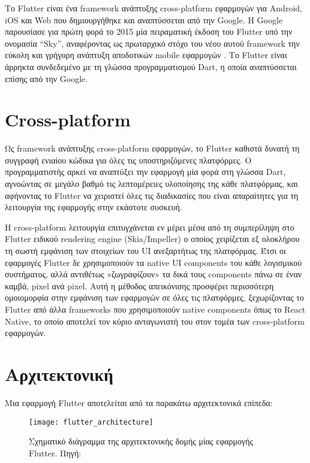 \documentclass[../thesis.tex]{subfiles}
\begin{document}
Το Flutter είναι ένα framework ανάπτυξης cross-platform εφαρμογών για Android, iOS και Web που δημιουργήθηκε και αναπτύσσεται από την Google.
Η Google παρουσίασε για πρώτη φορά το 2015 μία πειραματική έκδοση του Flutter υπό την ονομασία “Sky”, αναφέροντας ως πρωταρχικό στόχο του νέου αυτού framework την εύκολη και γρήγορη ανάπτυξη αποδοτικών mobile εφαρμογών \cite{flutter_presentation}.
Το Flutter είναι άρρηκτα συνδεδεμένο με τη γλώσσα προγραμματισμού Dart, η οποία αναπτύσσεται επίσης από την Google.

\section{Cross-platform}
Ως framework ανάπτυξης cross-platform εφαρμογών, το Flutter καθιστά δυνατή τη συγγραφή ενιαίου κώδικα για όλες τις υποστηριζόμενες πλατφόρμες.
Ο προγραμματιστής αρκεί να αναπτύξει την εφαρμογή μία φορά στη γλώσσα Dart,
αγνοώντας σε μεγάλο βαθμό τις λεπτομέρειες υλοποίησης της κάθε πλατφόρμας,
και αφήνοντας το Flutter να χειριστεί όλες τις διαδικασίες που είναι απαραίτητες για τη λειτουργία της εφαρμογής στην εκάστοτε συσκευή.

Η cross-platform λειτουργία επιτυγχάνεται εν μέρει μέσα από τη συμπερίληψη στο Flutter ειδικού rendering engine (Skia/Impeller) ο οποίος χειρίζεται εξ ολοκλήρου τη σωστή εμφάνιση των στοιχείων του UI ανεξαρτήτως της πλατφόρμας.
Έτσι οι εφαρμογές Flutter δε χρησιμοποιούν τα native UI components του κάθε λογισμικού συστήματος, αλλά αντιθέτως «ζωγραφίζουν» τα δικά τους components πάνω σε έναν καμβά, pixel ανά pixel.
Αυτή η μέθοδος απεικόνισης προσφέρει περισσότερη ομοιομορφία στην εμφάνιση των εφαρμογών σε όλες τις πλατφόρμες, ξεχωρίζοντας το Flutter από άλλα frameworks που χρησιμοποιούν native components όπως το React Native, το οποίο αποτελεί τον κύριο ανταγωνιστή του στον τομέα των cross-platform εφαρμογών.

\section{Αρχιτεκτονική}
Μια εφαρμογή Flutter αποτελείται από τα παρακάτω αρχιτεκτονικά επίπεδα:

\begin{figure}
    \centering
    \texttt{[image: flutter\_architecture]}
    \caption{Σχηματικό διάγραμμα της αρχιτεκτονικής δομής μίας εφαρμογής Flutter. Πηγή: \cite{flutter_architecture}}
\end{figure}
\end{document}
